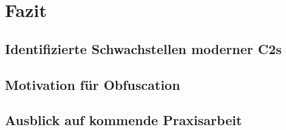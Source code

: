 \section{Fazit}
\subsection{Identifizierte Schwachstellen moderner C2s}
\subsection{Motivation für Obfuscation}
\subsection{Ausblick auf kommende Praxisarbeit}